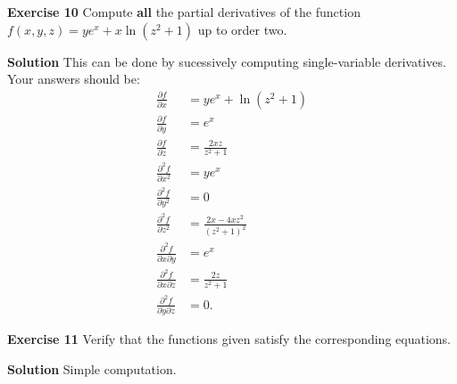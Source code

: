 \documentclass[12pt,oneside]{exam}
\newenvironment{exercise}[1]{\vspace{.1in}\noindent\textbf{Exercise #1 \hspace{.05em}}}{}
\newenvironment{newsolution}{\vspace{.1in}\noindent\textbf{Solution \hspace{.05em}}}{}
\begin{document}
\begin{exercise}{10}
Compute \textbf{all} the partial derivatives of the function $f(x,y,z)=ye^x+x\ln(z^2+1)$ up to order two. 
\end{exercise}

\begin{newsolution}
This can be done by sucessively computing single-variable derivatives. Your answers should be:
\begin{align*}
\frac{\partial f}{\partial x} & = ye^x + \ln(z^2+1) \\
\frac{\partial f}{\partial y} & = e^x\\
\frac{\partial f}{\partial z} & = \frac{2xz}{z^2+1} \\
\frac{\partial^2 f}{\partial x^2} & = ye^x \\
\frac{\partial^2 f}{\partial y^2} & = 0 \\
\frac{\partial^2 f}{\partial z^2} & = \frac{2x - 4xz^2}{(z^2+1)^2}\\
\frac{\partial^2 f}{\partial x \partial y} & = e^x \\
\frac{\partial^2 f}{\partial x \partial z} & = \frac{2z}{z^2+1}\\
\frac{\partial^2 f}{\partial y \partial z} & = 0.
\end{align*}
\end{newsolution}

\begin{exercise}{11}
Verify that the functions given satisfy the corresponding equations. 
\end{exercise}

\begin{newsolution}
Simple computation.
\end{newsolution}
\end{document}
